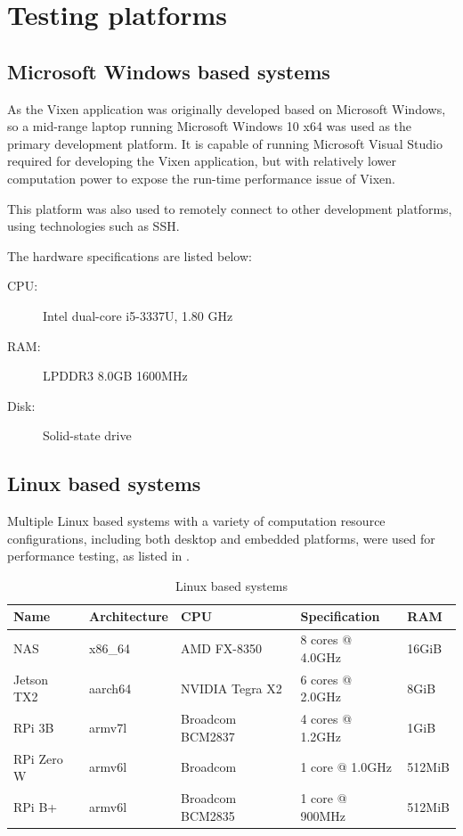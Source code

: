 \section{Testing platforms}

\subsection{Microsoft Windows based systems}

As the Vixen application was originally developed based on Microsoft Windows, so a mid-range laptop running Microsoft Windows 10 x64 was used as the primary development platform. It is capable of running Microsoft Visual Studio required for developing the Vixen application, but with relatively lower computation power to expose the run-time performance issue of Vixen.

This platform was also used to remotely connect to other development platforms, using technologies such as SSH.

The hardware specifications are listed below:

\begin{description}
  \item[CPU:]	Intel dual-core i5-3337U, 1.80 GHz
  \item[RAM:]	LPDDR3 8.0GB 1600MHz
  \item[Disk:]	Solid-state drive
\end{description}

\subsection{Linux based systems}

Multiple Linux based systems with a variety of computation resource configurations, including both desktop and embedded platforms, were used for performance testing, as listed in .

\begin{table}[!h]
  \centering
  \begin{tabular}{l|l|l|l|l}
    \hline
    \textbf{Name} & \textbf{Architecture} & \textbf{CPU} & \textbf{Specification} & \textbf{RAM} \\
    \hline
    NAS         & x86\_64 & AMD FX-8350 & 8 cores @ 4.0GHz       & 16GiB \\ \hline
    Jetson TX2  & aarch64 & NVIDIA Tegra X2 & 6 cores @ 2.0GHz   & 8GiB  \\ \hline
    RPi 3B      & armv7l  & Broadcom BCM2837 & 4 cores @ 1.2GHz  & 1GiB  \\ \hline
    RPi Zero W  & armv6l  & Broadcom & 1 core @ 1.0GHz           & 512MiB  \\ \hline
    RPi B+      & armv6l  & Broadcom BCM2835 & 1 core @ 900MHz   & 512MiB  \\ \hline
  \end{tabular}
  \caption{Linux based systems}
  \label{tbl:linux}
\end{table}

